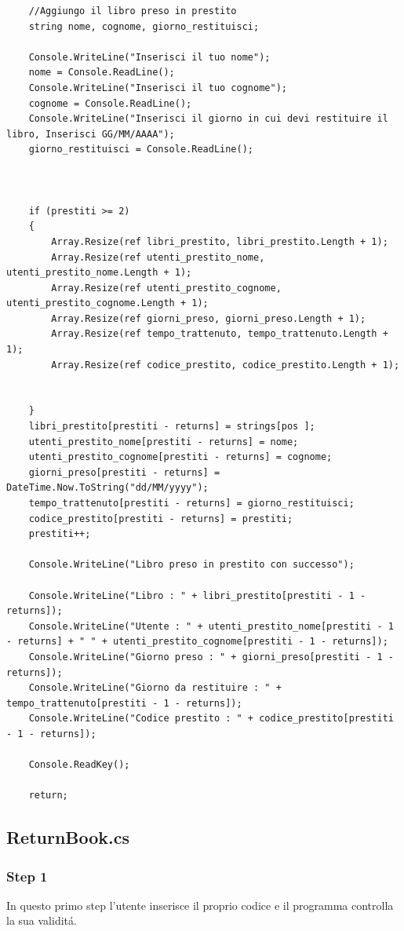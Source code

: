 \documentclass[a4paper,12pt]{article}
\begin{document}
\begin{lstlisting}
    //Aggiungo il libro preso in prestito
    string nome, cognome, giorno_restituisci;

    Console.WriteLine("Inserisci il tuo nome");
    nome = Console.ReadLine();
    Console.WriteLine("Inserisci il tuo cognome");
    cognome = Console.ReadLine();
    Console.WriteLine("Inserisci il giorno in cui devi restituire il libro, Inserisci GG/MM/AAAA");
    giorno_restituisci = Console.ReadLine();



    if (prestiti >= 2)
    {
        Array.Resize(ref libri_prestito, libri_prestito.Length + 1);
        Array.Resize(ref utenti_prestito_nome, utenti_prestito_nome.Length + 1);
        Array.Resize(ref utenti_prestito_cognome, utenti_prestito_cognome.Length + 1);
        Array.Resize(ref giorni_preso, giorni_preso.Length + 1);
        Array.Resize(ref tempo_trattenuto, tempo_trattenuto.Length + 1);
        Array.Resize(ref codice_prestito, codice_prestito.Length + 1);


    }
    libri_prestito[prestiti - returns] = strings[pos ];
    utenti_prestito_nome[prestiti - returns] = nome;
    utenti_prestito_cognome[prestiti - returns] = cognome;
    giorni_preso[prestiti - returns] = DateTime.Now.ToString("dd/MM/yyyy");
    tempo_trattenuto[prestiti - returns] = giorno_restituisci;
    codice_prestito[prestiti - returns] = prestiti;
    prestiti++;

    Console.WriteLine("Libro preso in prestito con successo");

    Console.WriteLine("Libro : " + libri_prestito[prestiti - 1 - returns]);
    Console.WriteLine("Utente : " + utenti_prestito_nome[prestiti - 1 - returns] + " " + utenti_prestito_cognome[prestiti - 1 - returns]);
    Console.WriteLine("Giorno preso : " + giorni_preso[prestiti - 1 - returns]);
    Console.WriteLine("Giorno da restituire : " + tempo_trattenuto[prestiti - 1 - returns]);
    Console.WriteLine("Codice prestito : " + codice_prestito[prestiti - 1 - returns]);

    Console.ReadKey();

    return;
\end{lstlisting}

\newpage

\subsection{ReturnBook.cs}
\subsubsection{Step 1}
In questo primo step l'utente inserisce il proprio codice e il programma controlla la sua validitá.
\end{document}
